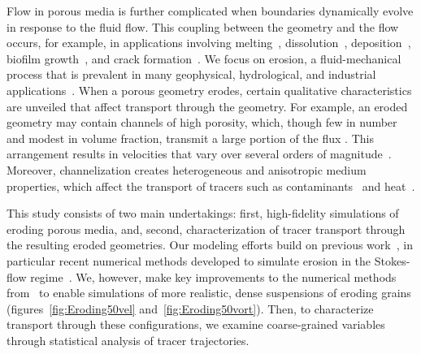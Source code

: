 \documentclass{jfm}
\begin{document}
Flow in porous media is further complicated when boundaries dynamically
evolve in response to the fluid flow. This coupling between the geometry
and the flow occurs, for example, in applications involving
melting~\citep{bec-vis1998, rycroft2016asymmetric, jambon2018singular,
favier2019rayleigh, morrow2019moving},
dissolution~\citep{kan-zha-che-he2002, mac2015shape, moo2017,
wykes2018self}, deposition~\citep{joh-eli1995, hewett2018modelling},
biofilm growth~\citep{tan-val-wer2015}, and crack
formation~\citep{cho2019crack}. We focus on erosion, a fluid-mechanical
process that is prevalent in many geophysical, hydrological, and
industrial applications~\citep{berhanu2012shape, hewett2017evolution,
lachaussee2018competitive, lopez2018cfd, allen2019sde, amin2019role}.
When a porous geometry erodes, certain qualitative characteristics are
unveiled that affect transport through the geometry.  For example, an
eroded geometry may contain channels of high porosity, which, though few
in number and modest in volume fraction, transmit a large portion of the
flux \citep{qua-moo2018}. This arrangement results in velocities that
vary over several orders of magnitude~\citep{all-hea-lab-rei2002}.
Moreover, channelization creates heterogeneous and anisotropic medium
properties, which affect the transport of tracers such as
contaminants~\citep{cve-che-wen1996, dag1987, kon-bre1978} and
heat~\citep{nil-sto1990, ree-sto1995}.

This study consists of two main undertakings: first, high-fidelity
simulations of eroding porous media, and, second, characterization of
tracer transport through the resulting eroded geometries. Our modeling
efforts build on previous work~\citep{ris-moo-chi-she-zha2012,
moore2013self, moo2017}, in particular recent numerical methods
developed to simulate erosion in the Stokes-flow
regime~\citep{qua-moo2018}. We, however, make key improvements to the
numerical methods from~\citep{qua-moo2018} to enable simulations of more
realistic, dense suspensions of eroding grains
(figures~\ref{fig:Eroding50vel} and~\ref{fig:Eroding50vort}).  Then, to
characterize transport through these configurations, we examine
coarse-grained variables through statistical analysis of tracer
trajectories.
\end{document}

